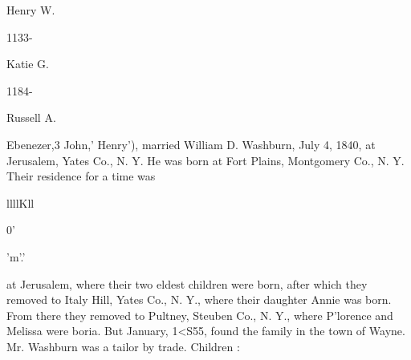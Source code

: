 \documentclass[oneside]{book}
\begin{document}
Henry W. 


1133- 




Katie G. 


1184- 




Russell A. 



Ebenezer,3 John,' Henry'), married William D. Washburn, July 
4, 1840, at Jerusalem, Yates Co., N. Y. He was born at Fort 
Plains, Montgomery Co., N. Y. Their residence for a time was 



llllKll 



0' 





'm'.' 




at Jerusalem, where their two eldest children were born, after 
which they removed to Italy Hill, Yates Co., N. Y., where their 
daughter Annie was born. From there they removed to Pultney, 
Steuben Co., N. Y., where P'lorence and Melissa were boria. 
But January, 1<S55, found the family in the town of Wayne. 
Mr. Washburn was a tailor by trade. Children : 
\end{document}

